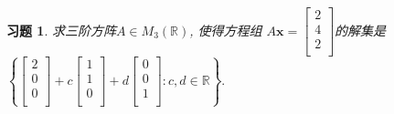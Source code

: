 \documentclass[UTF8]{ctexart}
\newcommand\bs[1]{\boldsymbol{ #1}}
\newtheorem{ex}[thm]{习题}
\begin{document}
\begin{ex}
求三阶方阵$A\in M_3(\mathbb{R})$, 使得方程组 $A\bs x= \begin{bmatrix} 2 \\ 4 \\ 2 \\ \end{bmatrix} $的解集是$\left\{\begin{bmatrix} 2 \\ 0 \\ 0 \\ \end{bmatrix}+c \begin{bmatrix} 1 \\ 1 \\ 0 \\ \end{bmatrix} + d \begin{bmatrix} 0 \\ 0 \\ 1 \\ \end{bmatrix} : c,d\in\mathbb{R} \right\}.$
\end{ex}
\end{document}
